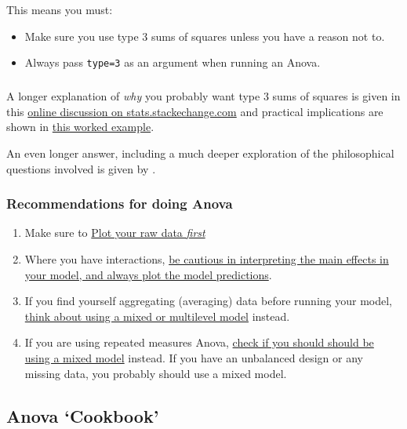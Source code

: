 \documentclass[]{article}
\providecommand{\tightlist}{%
  \setlength{\itemsep}{0pt}\setlength{\parskip}{0pt}}
\let\oldsubparagraph\subparagraph
\renewcommand{\subparagraph}[1]{\oldsubparagraph{#1}\mbox{}}
\theoremstyle{definition}
\theoremstyle{definition}
\theoremstyle{definition}
\theoremstyle{remark}
\begin{document}
This means you must:

\begin{itemize}
\tightlist
\item
  Make sure you use type 3 sums of squares unless you have a reason not
  to.
\item
  Always pass \texttt{type=3} as an argument when running an Anova.
\end{itemize}

\subparagraph{}\label{section-15}

A longer explanation of \emph{why} you probably want type 3 sums of
squares is given in this
\href{https://stats.stackexchange.com/questions/60362/choice-between-type-i-type-ii-or-type-iii-anova}{online
discussion on stats.stackechange.com} and practical implications are
shown in \href{http://dwoll.de/rexrepos/posts/anovaSStypes.html}{this
worked example}.

An even longer answer, including a much deeper exploration of the
philosophical questions involved is given by
\citet{venables1998exegeses}.

\subsubsection*{Recommendations for doing
Anova}\label{anova-recommendations}

\begin{enumerate}
\def\labelenumi{\arabic{enumi}.}
\item
  Make sure to \protect\hyperlink{graphics}{Plot your raw data
  \emph{first}}
\item
  Where you have interactions,
  \protect\hyperlink{understanding-interactions}{be cautious in
  interpreting the main effects in your model, and always plot the model
  predictions}.
\item
  If you find yourself aggregating (averaging) data before running your
  model, \protect\hyperlink{multilevel-models}{think about using a mixed
  or multilevel model} instead.
\item
  If you are using repeated measures Anova,
  \protect\hyperlink{multilevel-models}{check if you should should be
  using a mixed model} instead. If you have an unbalanced design or any
  missing data, you probably should use a mixed model.
\end{enumerate}

\hypertarget{anova-cookbook}{\subsection*{\texorpdfstring{Anova
`Cookbook'}{Anova Cookbook}}\label{anova-cookbook}}
\end{document}
